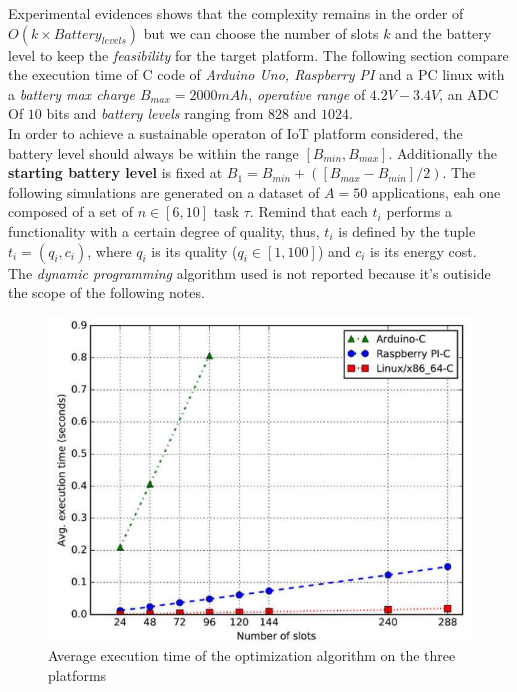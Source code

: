\documentclass[10pt,a4paper]{report}
\theoremstyle{definition}
\begin{document}
Experimental evidences shows that the complexity remains in the order of $O(k \times Battery_{levels})$ but we can choose the number of slots $k$ and the battery level to keep the \textit{feasibility} for the target platform. The following section compare the execution time of  C code of \textit{Arduino Uno, Raspberry PI} and a PC linux with a \textit{battery max charge $B_{max} = 2000 mAh$}, \textit{operative range} of $4.2V - 3.4V$, an ADC Of $10$ bits and \textit{battery levels} ranging from $828$ and $1024$.\\
In order to achieve a sustainable operaton of IoT platform considered, the battery level should always be within the range $[B_{min}, B_{max}]$. Additionally the \textbf{starting battery level} is fixed at $B_{1} = B_{min} + ([B_{max} - B_{min}]/2)$.
The following simulations are generated on a dataset of $A = 50$ applications, eah one composed of a set of $n \in [6,10]$ task $\tau$. Remind that each $t_{i}$ performs a functionality with a certain degree of quality, thus, $t_{i}$ is defined by the tuple $t_{i} = (q_{i} , c_{i})$, where $q_{i}$ is its quality ($q_{i} \in [1, 100]$) and $c_{i}$ is its energy cost.\\
The \textit{dynamic programming} algorithm used is not reported because it's outiside the scope of the following notes.
\begin{figure}[h]
	\centering\includegraphics[scale=0.40]{images/Pasted image 20230514113515.png}
	\caption{Average execution time of the optimization algorithm on the three platforms}
\end{figure}
\end{document}
